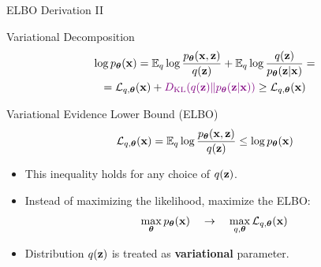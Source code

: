 \documentclass{beamer}
\renewcommand{\eqpause}{}
\renewcommand{\nextonslide}[1]{#1}
\begin{document}
\begin{frame}{ELBO Derivation II}
	\begin{block}{Variational Decomposition}
		\vspace{-0.7cm}
		\begin{multline*}
			\log \pt(\bx) = \bbE_{q}  \log \frac{\pt(\bx, \bz)}{q(\bz)} + \bbE_{q} \log \frac{q(\bz)}{\pt(\bz | \bx)}
			\nextonslide{= \\ = \cL_{q, \btheta}(\bx) + {\color{violet}\KL(q(\bz) \| \pt(\bz|\bx))}} 
			\nextonslide{\geq \cL_{q, \btheta}(\bx)}
		\end{multline*}
		\vspace{-0.5cm}
	\end{block}
	\eqpause
	\begin{block}{Variational Evidence Lower Bound (ELBO)}	
		\vspace{-0.3cm}
		\[
			\mathcal{L}_{q, \boldsymbol{\theta}}(\mathbf{x}) = \mathbb{E}_{q} \log \frac{p_{\boldsymbol{\theta}}(\mathbf{x}, \mathbf{z})}{q(\mathbf{z})}  \leq \log p_{\boldsymbol{\theta}}(\mathbf{x}) 
		\]
	\end{block}
	\eqpause
	\begin{itemize}
		\item This inequality holds for any choice of $q(\mathbf{z})$.
		\eqpause
		\item Instead of maximizing the likelihood, maximize the ELBO:
		\[
			\max_{\boldsymbol{\theta}} p_{\boldsymbol{\theta}}(\mathbf{x}) \quad \rightarrow \quad \max_{q, \boldsymbol{\theta}} \mathcal{L}_{q, \boldsymbol{\theta}}(\mathbf{x})
		\]
		\eqpause
		\vspace{-0.3cm}
		\item Distribution $q(\mathbf{z})$ is treated as \textbf{variational} parameter.
	\end{itemize}
\end{frame}
\end{document}
